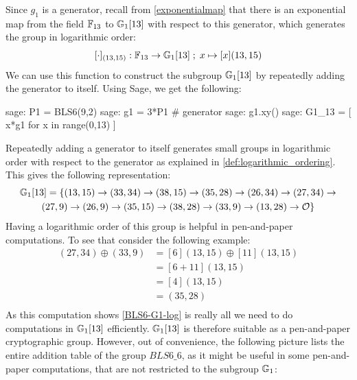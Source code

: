 Since $g_{1}$ is a generator, recall from \ref{exponentialmap} that there is an exponential map from the field $\mathbb{F}_{13}$ to $\mathbb{G}_1[13]$ with respect to this generator, which generates the group in logarithmic order:
$$
[\cdot]_{(13,15)}: \mathbb{F}_{13} \to \mathbb{G}_1[13]\;;\; x \mapsto [x](13,15)
$$ 
We can use this function to construct the subgroup $\mathbb{G}_1[13]$ by repeatedly adding the generator to itself. Using Sage, we get the following:
\begin{sagecommandline}
sage: P1 = BLS6(9,2)
sage: g1 = 3*P1 # generator
sage: g1.xy()
sage: G1_13 = [ x*g1 for x in range(0,13) ]
\end{sagecommandline}
Repeatedly adding a generator to itself generates small groups in logarithmic order with respect to the generator as explained in \ref{def:logarithmic_ordering}. This gives the following representation:
\begin{multline}
\label{BLS6-G1-log}
\G_1[13]=
\{(13,15) \rightarrow (33,34) \rightarrow  (38,15) \rightarrow  (35,28) \rightarrow (26,34) \rightarrow  (27,34) \rightarrow  \\ 
(27,9)  \rightarrow  (26,9) \rightarrow  (35,15) \rightarrow  (38,28) \rightarrow  (33,9) \rightarrow (13,28) \rightarrow  \mathcal{O}\}$$
\end{multline}
Having a logarithmic order of this group is helpful in pen-and-paper computations. To see that consider the following example:
\begin{align*}
(27,34)\oplus (33,9)  & = [6](13,15)\oplus [11](13,15)\\
                      & = [6+11](13,15)\\
                      & = [4](13,15)\\
                      & = (35,28)\\
\end{align*}
As this computation shows \ref{BLS6-G1-log} is really all we need to do computations in $\mathbb{G}_1[13]$ efficiently. $\mathbb{G}_1[13]$ is therefore suitable as a pen-and-paper cryptographic group. However, out of convenience, the following picture lists the entire addition table of the group $BLS6\_6$, as it might be useful in some pen-and-paper computations, that are not restricted to the subgroup $\mathbb{G}_1$:
\begingroup
    \fontsize{7pt}{7pt}\selectfont
